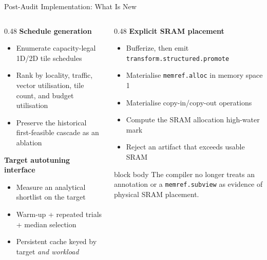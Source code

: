 \documentclass[10pt,aspectratio=169]{beamer}
\begin{document}
\begin{frame}{Post-Audit Implementation: What Is New}
\begin{columns}[T,totalwidth=0.99\textwidth]
\begin{column}{0.48\textwidth}
\textbf{Schedule generation}
\begin{itemize}
\small
\item Enumerate capacity-legal 1D/2D tile schedules
\item Rank by locality, traffic, vector utilisation, tile count, and budget utilisation
\item Preserve the historical first-feasible cascade as an ablation
\end{itemize}

\vspace{0.15cm}
\textbf{Target autotuning interface}
\begin{itemize}
\small
\item Measure an analytical shortlist on the target
\item Warm-up + repeated trials + median selection
\item Persistent cache keyed by target \emph{and workload}
\end{itemize}
\end{column}

\begin{column}{0.48\textwidth}
\textbf{Explicit SRAM placement}
\begin{itemize}
\small
\item Bufferize, then emit \texttt{transform.structured.promote}
\item Materialise \texttt{memref.alloc} in memory space 1
\item Materialise copy-in/copy-out operations
\item Compute the SRAM allocation high-water mark
\item Reject an artifact that exceeds usable SRAM
\end{itemize}

\vspace{0.15cm}
\begin{beamercolorbox}[sep=0.35em,center,rounded=true,shadow=true]{block body}
\small
The compiler no longer treats an annotation or a \texttt{memref.subview}
as evidence of physical SRAM placement.
\end{beamercolorbox}
\end{column}
\end{columns}
\end{frame}
\end{document}
